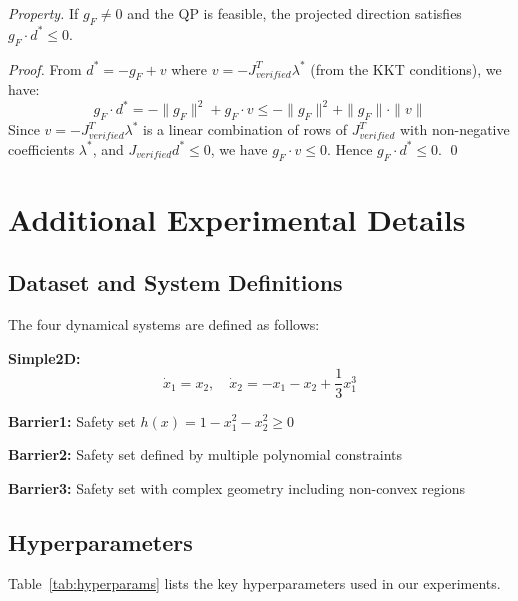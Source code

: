\textit{Property.} If $g_F \neq 0$ and the QP is feasible, the projected direction satisfies $g_F \cdot d^* \leq 0$.

\textit{Proof.} From $d^* = -g_F + v$ where $v = -J_{verified}^T \lambda^*$ (from the KKT conditions), we have:
\begin{equation}
    g_F \cdot d^* = -\|g_F\|^2 + g_F \cdot v \leq -\|g_F\|^2 + \|g_F\| \cdot \|v\|
\end{equation}
Since $v = -J_{verified}^T \lambda^*$ is a linear combination of rows of $J_{verified}^T$ with non-negative coefficients $\lambda^*$, and $J_{verified} d^* \leq 0$, we have $g_F \cdot v \leq 0$. Hence $g_F \cdot d^* \leq 0$. \qed

\section{Additional Experimental Details}

\subsection{Dataset and System Definitions}

The four dynamical systems are defined as follows:

\textbf{Simple2D:}
\begin{equation}
    \dot{x}_1 = x_2, \quad \dot{x}_2 = -x_1 - x_2 + \frac{1}{3}x_1^3
\end{equation}

\textbf{Barrier1:} Safety set $h(x) = 1 - x_1^2 - x_2^2 \geq 0$

\textbf{Barrier2:} Safety set defined by multiple polynomial constraints

\textbf{Barrier3:} Safety set with complex geometry including non-convex regions

\subsection{Hyperparameters}

Table~\ref{tab:hyperparams} lists the key hyperparameters used in our experiments.

